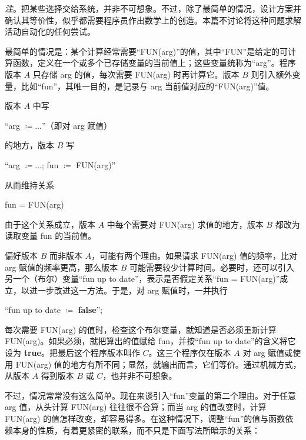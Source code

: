 \documentclass[twoside,11pt,fontset=none]{ctexbook}
\begin{document}
\noindent
\textit{注}。把某些选择交给系统，并非不可想象。不过，除了最简单的情况，设计方案并确认其等价性，似乎都需要程序员作出数学上的创造。本篇不讨论将这种问题求解活动自动化的任何尝试。

最简单的情况是：某个计算经常需要“FUN(arg)”的值，其中“FUN”是给定的可计算函数，定义在一个或多个已存储变量的当前值上；这些变量统称为“arg”。程序版本 $A$ 只存储 arg 的值，每次需要 FUN(arg) 时再计算它。版本 $B$ 则引入额外变量，比如“fun”，其唯一目的，是记录与 arg 当前值对应的“FUN(arg)”值。

版本 $A$ 中写
\medskip

{
	\setlength{\parindent}{8em}
	\hspace{-.4em}``arg $\coloneq \dots$''（即对 arg 赋值）
	
}
\medskip

\noindent
的地方，版本 $B$ 写
\medskip

{
	\setlength{\parindent}{8em}
	\hspace{-.4em}``arg $\coloneq \dots$; fun $\coloneq$ FUN(arg)''
	
}
\medskip

\noindent
从而维持关系
\medskip

{
	\setlength{\parindent}{8em}
	fun = FUN(arg)
}
\medskip

\noindent
由于这个关系成立，版本 $A$ 中每个需要对 FUN(arg) 求值的地方，版本 $B$ 都改为读取变量 fun 的当前值。

偏好版本 $B$ 而非版本 $A$，可能有两个理由。如果请求 FUN(arg) 值的频率，比对 arg 赋值的频率更高，那么版本 $B$ 可能需要较少计算时间。必要时，还可以引入另一个（布尔）变量“fun up to date”，表示是否假定关系“fun = FUN(arg)”成立，以进一步改进这一方法。于是，对 arg 赋值时，一并执行
\medskip

{
	\setlength{\parindent}{8em}
	\hspace{-.4em}``fun up to date $\coloneq$ \textbf{false}'';
}
\medskip

\noindent
每次需要 FUN(arg) 的值时，检查这个布尔变量，就知道是否必须重新计算 FUN(arg)。如果必须，就把算出的值赋给 fun，并按“fun up to date”的含义将它设为 \textbf{true}。把最后这个程序版本叫作 $C$。这三个程序仅在版本 $A$ 对 arg 赋值或使用 FUN(arg) 值的地方有所不同；显然，就输出而言，它们等价。通过机械方式，从版本 $A$ 得到版本 $B$ 或 $C$，也并非不可想象。

不过，情况常常没有这么简单。现在来谈引入“fun”变量的第二个理由。对于任意 arg 值，从头计算 FUN(arg) 往往很不合算；而当 arg 的值改变时，计算 FUN(arg) 的值怎样改变，却容易得多。在这种情况下，调整“fun”的值与函数依赖本身的性质，有着更紧密的联系，而不只是下面写法所暗示的关系：
\medskip
\end{document}
